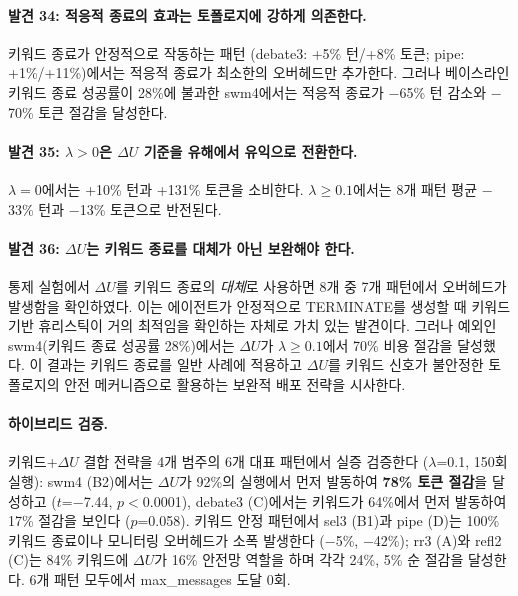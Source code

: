 \documentclass[a4paper,11pt]{article}
\begin{document}


\paragraph{발견 34: 적응적 종료의 효과는 토폴로지에 강하게 의존한다.}
키워드 종료가 안정적으로 작동하는 패턴 (debate3: +5\% 턴/+8\% 토큰; pipe: +1\%/+11\%)에서는 적응적 종료가 최소한의 오버헤드만 추가한다. 그러나 베이스라인 키워드 종료 성공률이 28\%에 불과한 swm4에서는 적응적 종료가 $-$65\% 턴 감소와 $-$70\% 토큰 절감을 달성한다.

\paragraph{발견 35: $\lambda > 0$은 $\Delta U$ 기준을 유해에서 유익으로 전환한다.}
$\lambda=0$에서는 +10\% 턴과 +131\% 토큰을 소비한다. $\lambda \geq 0.1$에서는 8개 패턴 평균 $-$33\% 턴과 $-$13\% 토큰으로 반전된다.

\paragraph{발견 36: $\Delta U$는 키워드 종료를 대체가 아닌 보완해야 한다.}
통제 실험에서 $\Delta U$를 키워드 종료의 \emph{대체}로 사용하면 8개 중 7개 패턴에서 오버헤드가 발생함을 확인하였다. 이는 에이전트가 안정적으로 TERMINATE를 생성할 때 키워드 기반 휴리스틱이 거의 최적임을 확인하는 자체로 가치 있는 발견이다. 그러나 예외인 swm4(키워드 종료 성공률 28\%)에서는 $\Delta U$가 $\lambda \geq 0.1$에서 70\% 비용 절감을 달성했다. 이 결과는 키워드 종료를 일반 사례에 적용하고 $\Delta U$를 키워드 신호가 불안정한 토폴로지의 안전 메커니즘으로 활용하는 보완적 배포 전략을 시사한다.

\paragraph{하이브리드 검증.} 키워드+$\Delta U$ 결합 전략을 4개 범주의 6개 대표 패턴에서 실증 검증한다 ($\lambda$=0.1, 150회 실행): swm4 (B2)에서는 $\Delta U$가 92\%의 실행에서 먼저 발동하여 \textbf{78\% 토큰 절감}을 달성하고 ($t$=$-$7.44, $p<$0.0001), debate3 (C)에서는 키워드가 64\%에서 먼저 발동하여 17\% 절감을 보인다 ($p$=0.058). 키워드 안정 패턴에서 sel3 (B1)과 pipe (D)는 100\% 키워드 종료이나 모니터링 오버헤드가 소폭 발생한다 ($-$5\%, $-$42\%); rr3 (A)와 refl2 (C)는 84\% 키워드에 $\Delta U$가 16\% 안전망 역할을 하며 각각 24\%, 5\% 순 절감을 달성한다. 6개 패턴 모두에서 max\_messages 도달 0회.
\end{document}
